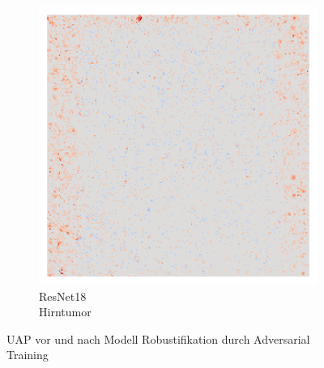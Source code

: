 \begin{figure}[H]
\begin{subfigure}{0.19\linewidth}
        \includegraphics[width=\linewidth]{01-images/05-resultate/uap_resnet18/uap0-resnet18-mri_data-n200-robustificationslevel6.png}
        \caption{ResNet18 \\ Hirntumor}
    \end{subfigure}
    \caption{UAP vor und nach Modell Robustifikation durch Adversarial Training}
    \label{fig:uap-vor-nach-resnet18}
\end{figure}

